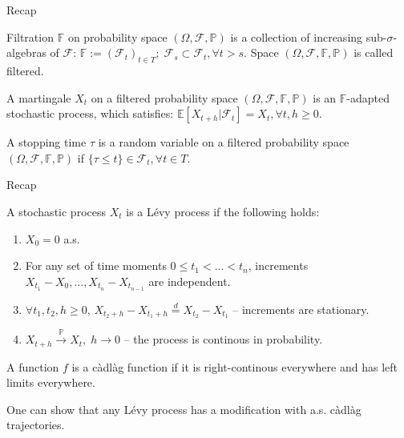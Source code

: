 \documentclass{beamer}%
\theoremstyle{definition}
\newcommand{\E}{\mathbb{E}}
\renewcommand{\P}{\mathbb{P}}
\begin{document}
\begin{frame}{Recap}
\begin{definition}
Filtration $\mathbb{F}$ on probability space $(\Omega, \mathcal{F}, \mathbb{P})$ is a collection of increasing sub-$\sigma$-algebras of $\mathcal{F}$: $\mathbb{F} := (\mathcal{F}_t)_{t \in T}; \; \mathcal{F}_s \subset \mathcal{F}_t, \forall t > s$. Space $(\Omega, \mathcal{F}, \mathbb{F}, \mathbb{P})$ is called filtered.
\end{definition}

\begin{definition}
A martingale $X_t$ on a filtered probability space $(\Omega, \mathcal{F}, \mathbb{F}, \mathbb{P})$ is an $\mathbb{F}$-adapted stochastic process, which satisfies: $\E[X_{t+h}|\mathcal{F}_t] = X_t, \forall t, h \geq 0 $.
\end{definition}

\begin{definition}
    A stopping time $\tau$ is a random variable on a filtered probability space $(\Omega, \mathcal{F}, \mathbb{F}, \mathbb{P})$ if $\{\tau \leq t\} \in \mathcal{F}_t, \forall t \in T$.
\end{definition}
    
\end{frame}

\begin{frame}{Recap}
\begin{definition}
    A stochastic process $X_t$ is a Lévy process if the following holds:
    \begin{enumerate}
        \item $X_0 = 0$ a.s.
        \item For any set of time moments $0 \leq t_1 < ... < t_n$, increments $X_{t_1} - X_0, \ldots, X_{t_{n}} -X_{t_{n-1}}$ are independent.
        \item $\forall t_1, t_2, h \geq 0$, $X_{t_2+h} - X_{t_1+h} \overset{d}{=}
        X_{t_2} - X_{t_1}$ -- increments are stationary.
        \item $X_{t+h}\overset{\P}{\to} X_t, \; h \to 0$ -- the process is continous in probability.
        
    \end{enumerate}
\end{definition}

\begin{definition}
    A function $f$ is a càdlàg function if it is right-continous everywhere and has left limits everywhere.
\end{definition}
One can show that any Lévy process has a modification with a.s. càdlàg trajectories.

\end{frame}
\end{document}
